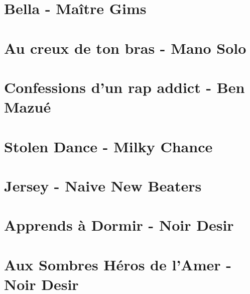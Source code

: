 \documentclass{guitartabs}
\begin{document}
\section{Bella - Maître Gims}
\begin{guitar}

\end{guitar}


\section{Au creux de ton bras - Mano Solo}
\begin{guitar}

\end{guitar}


\section{Confessions d'un rap addict - Ben Mazué}
\begin{guitar}

\end{guitar}

\section{Stolen Dance - Milky Chance}
\begin{guitar}

\end{guitar}


\section{Jersey - Naive New Beaters}
\begin{guitar}

\end{guitar}



\section*{Apprends à Dormir - Noir Desir}
\begin{guitar}

\end{guitar}

\section{Aux Sombres Héros de l'Amer - Noir Desir}
\begin{guitar}

\end{guitar}
\end{document}
